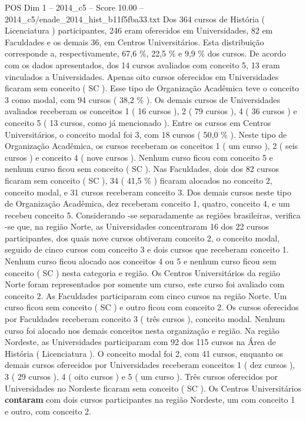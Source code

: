 \begin{textsample}{POS Dim 1 – 2014\_c5 – Score 10.00 – 2014\_c5/enade\_2014\_hist\_b11f5fba33.txt}
Dos 364 cursos de História ( Licenciatura ) participantes, 246 eram oferecidos em Universidades, 82 em Faculdades e os demais 36, em Centros Universitários.
Esta distribuição corresponde a, respectivamente, 67,6 \%, 22,5 \% e 9,9 \% dos cursos.
De acordo com os dados apresentados, dos 14 cursos avaliados com conceito 5, 13 eram vinculados a Universidades.
Apenas oito cursos oferecidos em Universidades ficaram sem conceito ( SC ).
Esse tipo de Organização Acadêmica teve o conceito 3 como modal, com 94 cursos ( 38,2 \% ).
Os demais cursos de Universidades avaliados receberam os conceitos 1 ( 16 cursos ), 2 ( 79 cursos ), 4 ( 36 cursos ) e conceito 5 ( 13 cursos, como já mencionado ).
Entre os cursos em Centros Universitários, o conceito modal foi 3, com 18 cursos ( 50,0 \% ).
Neste tipo de Organização Acadêmica, os cursos receberam os conceitos 1 ( um curso ), 2 ( seis cursos ) e conceito 4 ( nove cursos ).
Nenhum curso ficou com conceito 5 e nenhum curso ficou sem conceito ( SC ).
Nas Faculdades, dois dos 82 cursos ficaram sem conceito ( SC ), 34 ( 41,5 \% ) ficaram alocados no conceito 2, conceito modal, e 31 cursos receberam conceito 3.
Dos demais cursos neste tipo de Organização Acadêmica, dez receberam conceito 1, quatro, conceito 4, e um recebeu conceito 5.
Considerando -se separadamente as regiões brasileiras, verifica -se que, na região Norte, as Universidades concentraram 16 dos 22 cursos participantes, dos quais nove cursos obtiveram conceito 2, o conceito modal, seguido de cinco cursos com conceito 3 e dois cursos que receberam conceito 1.
Nenhum curso ficou alocado aos conceitos 4 ou 5 e nenhum curso ficou sem conceito ( SC ) nesta categoria e região.
Os Centros Universitários da região Norte foram representados por somente um curso, este curso foi avaliado com conceito 2.
As Faculdades participaram com cinco cursos na região Norte.
Um curso ficou sem conceito ( SC ) e outro ficou com conceito 2.
Os cursos oferecidos por Faculdades receberam conceito 3 ( três cursos ), conceito modal.
Nenhum curso foi alocado nos demais conceitos nesta organização e região.
Na região Nordeste, as Universidades participaram com 92 dos 115 cursos na Área de História ( Licenciatura ).
O conceito modal foi 2, com 41 cursos, enquanto os demais cursos oferecidos por Universidades receberam conceitos 1 ( dez cursos ), 3 ( 29 cursos ), 4 ( oito cursos ) e 5 ( um curso ).
Três cursos oferecidos por Universidades no Nordeste ficaram sem conceito ( SC ).
Os Centros Universitários \textbf{contaram} com dois cursos participantes na região Nordeste, um com conceito 1 e outro, com conceito 2.

\end{textsample}
